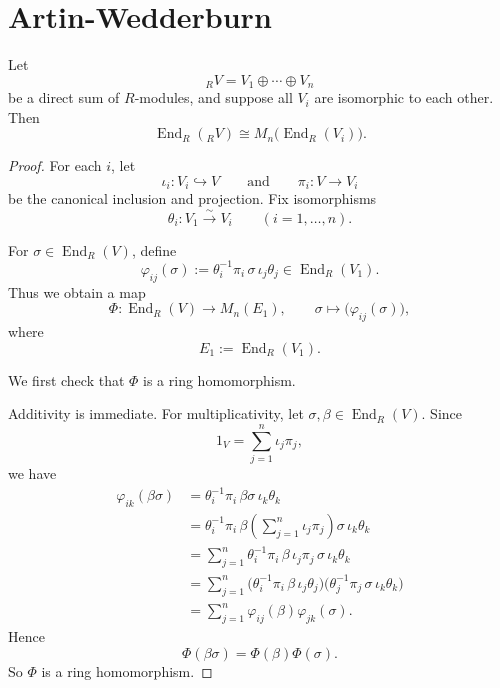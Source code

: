 \section{Artin-Wedderburn}

\begin{theorem}
    Let
    \[
        {}_RV = V_1 \oplus \cdots \oplus V_n
    \]
    be a direct sum of $R$-modules, and suppose all $V_i$ are isomorphic to each other.
    Then
    \[
        \operatorname{End}_R({}_RV) \cong M_n\bigl(\operatorname{End}_R(V_i)\bigr).
    \]
\end{theorem}

\begin{proof}
    For each $i$, let
    \[
        \iota_i:V_i\hookrightarrow V
        \qquad\text{and}\qquad
        \pi_i:V\to V_i
    \]
    be the canonical inclusion and projection. Fix isomorphisms
    \[
        \theta_i:V_1\xrightarrow{\sim} V_i
        \qquad (i=1,\dots,n).
    \]

    For $\sigma\in \operatorname{End}_R(V)$, define
    \[
        \varphi_{ij}(\sigma):=\theta_i^{-1}\pi_i\,\sigma\,\iota_j\theta_j
        \in \operatorname{End}_R(V_1).
    \]
    Thus we obtain a map
    \[
        \Phi:\operatorname{End}_R(V)\longrightarrow M_n(E_1),
        \qquad
        \sigma\longmapsto \bigl(\varphi_{ij}(\sigma)\bigr),
    \]
    where
    \[
        E_1:=\operatorname{End}_R(V_1).
    \]

    We first check that $\Phi$ is a ring homomorphism.

    Additivity is immediate. For multiplicativity, let $\sigma,\beta\in \operatorname{End}_R(V)$. Since
    \[
        1_V=\sum_{j=1}^n \iota_j\pi_j,
    \]
    we have
    \begin{align*}
        \varphi_{ik}(\beta\sigma)
         & =\theta_i^{-1}\pi_i\,\beta\sigma\,\iota_k\theta_k             \\
         & =\theta_i^{-1}\pi_i\,\beta
        \left(\sum_{j=1}^n \iota_j\pi_j\right)
        \sigma\,\iota_k\theta_k                                          \\
         & =\sum_{j=1}^n
        \theta_i^{-1}\pi_i\,\beta\,\iota_j\pi_j\,\sigma\,\iota_k\theta_k \\
         & =\sum_{j=1}^n
        \bigl(\theta_i^{-1}\pi_i\,\beta\,\iota_j\theta_j\bigr)
        \bigl(\theta_j^{-1}\pi_j\,\sigma\,\iota_k\theta_k\bigr)          \\
         & =\sum_{j=1}^n \varphi_{ij}(\beta)\varphi_{jk}(\sigma).
    \end{align*}
    Hence
    \[
        \Phi(\beta\sigma)=\Phi(\beta)\Phi(\sigma).
    \]
    So $\Phi$ is a ring homomorphism.


\end{proof}
